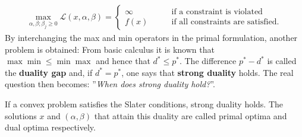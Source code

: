     \begin{gather}
        \max_{\alpha,\beta;\beta_j\geq0}\mathcal{L}(x,\alpha,\beta) =
        \begin{cases}
            \infty&\qquad\text{if a constraint is violated}\\
            f(x)&\qquad\text{if all constraints are satisfied}.
        \end{cases}
    \end{gather}
    By interchanging the max and min operators in the primal formulation, another problem is obtained:
    From basic calculus it is known that $\max\min\leq\min\max$ and hence that $d^*\leq p^*$. The difference $p^*-d^*$ is called the \textbf{duality gap} and, if $d^*=p^*$, one says that \textbf{strong duality} holds. The real question then becomes: ''\textit{When does strong duality hold?}''.
    \begin{property}
        If a convex problem satisfies the Slater conditions, strong duality holds. The solutions $x$ and $(\alpha,\beta)$ that attain this duality are called primal optima and dual optima respectively.
    \end{property}

